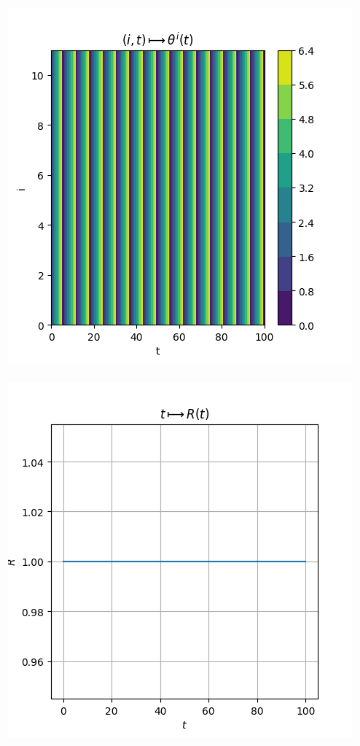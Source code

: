 \documentclass[1pt, a4paper]{article}
\begin{document}
\begin{figure}[htbp]
    \hfill
    \begin{subfigure}{0.30\textwidth}
        \centering
        \includegraphics[scale=0.40]{figures/Niiho_kuramoto.png}
        \caption{}
        \label{subfig:kuramoto}
    \end{subfigure}
    \hfill
    \begin{subfigure}{0.30\textwidth}
        \centering
        \includegraphics[scale=0.40]{figures/mag_Niiho.png}

\end{subfigure}
\end{figure}
\end{document}
